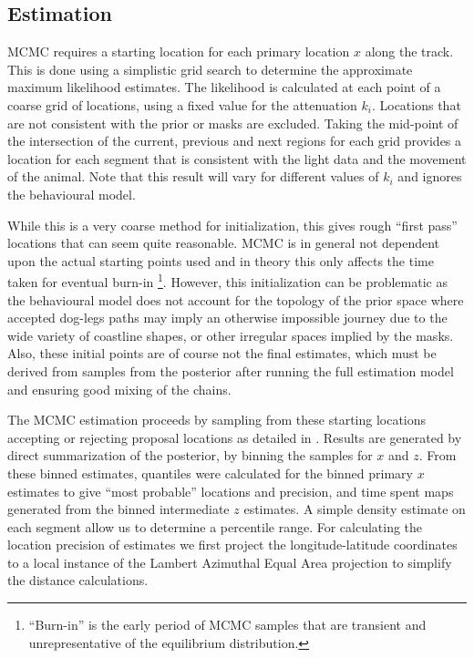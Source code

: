 \documentclass[10pt]{article}
\begin{document}
\subsection*{Estimation}
MCMC requires a starting location for each primary location $x$ along
the track. This is done using a simplistic grid search to determine
the approximate maximum likelihood estimates. The likelihood is
calculated at each point of a coarse grid of locations, using a fixed
value for the attenuation $k_{i}$.  Locations that are not consistent
with the prior or masks are excluded.  Taking the mid-point of the
intersection of the current, previous and next regions for each grid
provides a location for each segment that is consistent with the light
data and the movement of the animal. Note that this result will vary
for different values of $k_{i}$ and ignores the behavioural model.

While this is a very coarse method for initialization, this gives
rough ``first pass'' locations that can seem quite reasonable.  MCMC
is in general not dependent upon the actual starting points used
\cite{Gilks:MCMC} and in theory this only affects the time taken for
eventual burn-in \footnote{``Burn-in'' is the early period of
  MCMC samples that are transient and unrepresentative of the
  equilibrium distribution.}. However, this initialization can be
problematic as the behavioural model does not account for the topology
of the prior space where accepted dog-legs paths may imply an
otherwise impossible journey due to the wide variety of coastline
shapes, or other irregular spaces implied by the masks.  Also, these
initial points are of course not the final estimates, which must be
derived from samples from the posterior after running the full
estimation model and ensuring good mixing of the chains.

The MCMC estimation proceeds by sampling from these starting locations
accepting or rejecting proposal locations as detailed in
\cite{sumner2009}.  Results are generated by direct summarization of
the posterior, by binning the samples for $x$ and $z$.  From these
binned estimates, quantiles were calculated for the binned primary $x$
estimates to give ``most probable'' locations and precision, and time
spent maps generated from the binned intermediate $z$ estimates. A
simple density estimate on each segment allow us to determine a
percentile range. For calculating the location precision of estimates
we first project the longitude-latitude coordinates to a local
instance of the Lambert Azimuthal Equal Area projection
\cite{evenden1990cartographic} to simplify the distance calculations.
\end{document}
